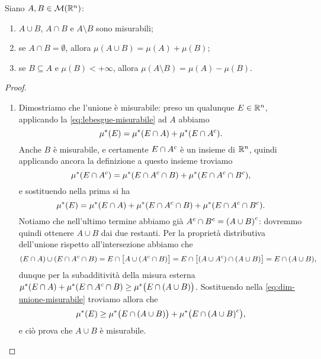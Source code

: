 \begin{proprieta} \label{pr:misura-unione-intersezione}
	Siano $A,B\in\mathcal M(\mathbb{R}^n)$:
	\begin{enumerate}
		\item $A\cup B$, $A\cap B$ e $A\setminus B$ sono misurabili;
		\item se $A\cap B=\emptyset$, allora $\mu(A\cup B)=\mu(A)+\mu(B)$;
		\item se $B\subseteq A$ e $\mu(B)<+\infty$, allora $\mu(A\setminus B)=\mu(A)-\mu(B)$.
	\end{enumerate}
\end{proprieta}
\begin{proof}
	\begin{enumerate}
		\item Dimostriamo che l'unione è misurabile: preso un qualunque $E\in\mathbb{R}^n$, applicando la \eqref{eq:lebesgue-misurabile} ad $A$ abbiamo
			\begin{equation}
				\mu^*(E)=\mu^*(E\cap A)+\mu^*(E\cap{A}^c).
			\end{equation}
			Anche $B$ è misurabile, e certamente $E\cap{A}^c$ è un insieme di $\mathbb{R}^n$, quindi applicando ancora la definizione a questo insieme troviamo
			\begin{equation}
				\mu^*(E\cap{A}^c)=\mu^*(E\cap{A}^c\cap B)+\mu^*(E\cap{A}^c\cap{B}^c),
			\end{equation}
			e sostituendo nella prima si ha
			\begin{equation}
				\mu^*(E)=\mu^*(E\cap A)+\mu^*(E\cap{A}^c\cap B)+\mu^*(E\cap{A}^c\cap{B}^c).
				\label{eq:dim-unione-misurabile}
			\end{equation}
			Notiamo che nell'ultimo termine abbiamo già ${A}^c\cap{B}^c={(A\cup B)}^c$: dovremmo quindi ottenere $A\cup B$ dai due restanti.
			Per la proprietà distributiva dell'unione rispetto all'intersezione abbiamo che
			\begin{equation}
				(E\cap A)\cup(E\cap{A}^c\cap B)=E\cap\big[A\cup({A}^c\cap B)\big]=E\cap\big[(A\cup{A}^c)\cap(A\cup B)\big]=E\cap(A\cup B),
			\end{equation}
			dunque per la subadditività della misura esterna $\mu^*(E\cap A)+\mu^*(E\cap{A}^c\cap B)\geq\mu^*\big(E\cap(A\cup B)\big)$.
			Sostituendo nella \eqref{eq:dim-unione-misurabile} troviamo allora che
			\begin{equation}
				\mu^*(E)\geq\mu^*\big(E\cap(A\cup B)\big)+\mu^*\big(E\cap{(A\cup B)}^c\big),
			\end{equation}
			e ciò prova che $A\cup B$ è misurabile.
			

\end{enumerate}
\end{proof}

